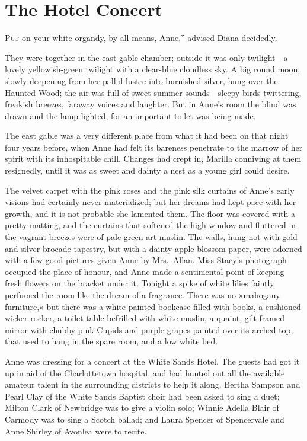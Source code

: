 \chapter{The Hotel Concert}

\lettrine[ante=“,lines=4]{P}{ut} on your white organdy, by all means, Anne,” advised Diana decidedly.

\zz
They were together in the east gable chamber; outside it was only twilight—a lovely yellowish-green twilight with a clear-blue cloudless sky. A big round moon, slowly deepening from her pallid lustre into burnished silver, hung over the Haunted Wood; the air was full of sweet summer sounds—sleepy birds twittering, freakish breezes, faraway voices and laughter. But in Anne's room the blind was drawn and the lamp lighted, for an important toilet was being made.

The east gable was a very different place from what it had been on that night four years before, when Anne had felt its bareness penetrate to the marrow of her spirit with its inhospitable chill. Changes had crept in, Marilla conniving at them resignedly, until it was as sweet and dainty a nest as a young girl could desire.

The velvet carpet with the pink roses and the pink silk curtains of Anne's early visions had certainly never materialized; but her dreams had kept pace with her growth, and it is not probable she lamented them. The floor was covered with a pretty matting, and the curtains that softened the high window and fluttered in the vagrant breezes were of pale-green art muslin. The walls, hung not with gold and silver brocade tapestry, but with a dainty apple-blossom paper, were adorned with a few good pictures given Anne by Mrs.~Allan. Miss Stacy's photograph occupied the place of honour, and Anne made a sentimental point of keeping fresh flowers on the bracket under it. Tonight a spike of white lilies faintly perfumed the room like the dream of a fragrance. There was no »mahogany furniture,« but there was a white-painted bookcase filled with books, a cushioned wicker rocker, a toilet table befrilled with white muslin, a quaint, gilt-framed mirror with chubby pink Cupids and purple grapes painted over its arched top, that used to hang in the spare room, and a low white bed.

Anne was dressing for a concert at the White Sands Hotel. The guests had got it up in aid of the Charlottetown hospital, and had hunted out all the available amateur talent in the surrounding districts to help it along. Bertha Sampson and Pearl Clay of the White Sands Baptist choir had been asked to sing a duet; Milton Clark of Newbridge was to give a violin solo; Winnie Adella Blair of Carmody was to sing a Scotch ballad; and Laura Spencer of Spencervale and Anne Shirley of Avonlea were to recite.

